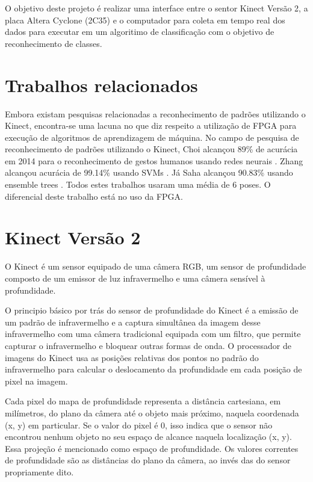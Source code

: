 \documentclass[12pt]{article}
\begin{document}
O objetivo deste projeto é realizar uma interface entre o sentor Kinect Versão 2,
a placa Altera Cyclone (2C35) e o computador para coleta em tempo real dos dados para
executar em um algoritimo de classificação com o objetivo de reconhecimento de classes.

\section{Trabalhos relacionados}

Embora existam pesquisas relacionadas a reconhecimento de padrões utilizando o Kinect, encontra-se uma lacuna no que diz respeito a
utilização de FPGA para execução de algoritmos de aprendizagem de máquina. No campo de pesquisa de reconhecimento de padrões
utilizando o Kinect, Choi alcançou 89\% de acurácia em 2014 para o reconhecimento de gestos humanos
usando redes neurais \cite{choi2014design}. Zhang alcançou acurácia de 99.14\%
usando SVMs \cite{zhang2014novel}. Já Saha alcançou 90.83\% usando ensemble trees
\cite{saha2014study}. Todos estes trabalhos usaram uma média de 6 poses. 
O diferencial deste trabalho está no uso da FPGA.

\section{Kinect Vers\~ao 2} \label{sec:kinectversion2}

O Kinect é um sensor equipado de uma câmera RGB, um sensor de profundidade
composto de um emissor de luz infravermelho e uma câmera sensível à
profundidade.

O principio básico por trás do sensor de profundidade do Kinect é a emissão de
um padrão de infravermelho e a captura simultânea da imagem desse infravermelho
com uma câmera tradicional equipada com um filtro, que permite capturar o 
infravermelho e bloquear outras formas de onda. O processador de imagens do 
Kinect usa as posições relativas dos pontos 
no padrão do infravermelho para calcular o deslocamento da profundidade em cada
posição de pixel na imagem.

Cada pixel do mapa de profundidade representa a distância cartesiana, em 
milímetros, do plano da câmera até o objeto mais próximo, naquela coordenada
(x, y) em particular. Se o valor do pixel é 0, isso indica que o sensor não 
encontrou nenhum objeto no seu espaço de alcance naquela localização (x, y).
Essa projeção é mencionado como espaço de profundidade. Os valores correntes de
profundidade são as distâncias do plano da câmera, ao invés das do sensor 
propriamente dito.
\end{document}
